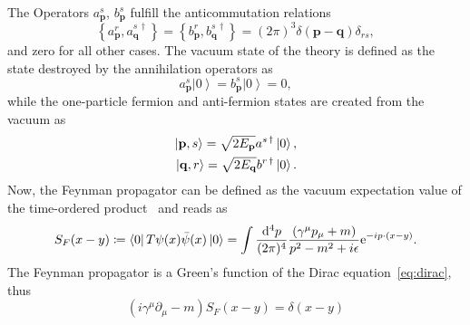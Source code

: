 The Operators $a^{s}_{\mathbf{p}}$, $b^{s}_{\mathbf{p}}$ fulfill the anticommutation relations
\begin{equation}
\left\{ a^{r}_\mathbf{p},a^{s\,\dagger}_\mathbf{q}\right\} = \left\{ b^{r}_\mathbf{p},b^{s\,\dagger}_\mathbf{q}\right\} = (2\pi)^3 \delta (\mathbf{p}-\mathbf{q})\delta_{rs},
\end{equation}
and zero for all other cases. The vacuum state of the theory is defined as the state destroyed by the annihilation operators as
\begin{equation}
a^s_\mathbf{p}\left|0\right> = b^s_\mathbf{p}\left|0\right> = 0,
\end{equation}
while the one-particle fermion and anti-fermion states are created from the vacuum as
\begin{align}
\left|\mathbf{p},s\right> = \sqrt{2E_\mathbf{p}}a^{s\,\dagger}\left|0\right>,\notag\\
\left|\mathbf{q},r\right> = \sqrt{2E_\mathbf{q}}b^{r\,\dagger}\left|0\right>.
\end{align}
Now, the Feynman propagator can be defined as the vacuum expectation value of the time-ordered product~\cite[Section 3.5.]{peskin1995} and reads as
\begin{equation}
S_F(x-y)\coloneqq \left<0\right|T\psi(x)\bar{\psi}(x)\left|0\right>=\int \frac{\mathrm{d}^4p}{(2\pi)^4}\frac{ (\gamma^\mu p_\mu+m)}{p^2-m^2+i\epsilon}\text{e}^{-ip\cdot(x-y)}.
\label{eq:freepropdef}
\end{equation}
The Feynman propagator is a Green's function of the Dirac equation~\eqref{eq:dirac}, thus
\begin{equation}
\left(i\gamma^\mu \partial_\mu -m\right)S_F(x-y)=\delta(x-y)
\label{eq:freeprop}
\end{equation} 
